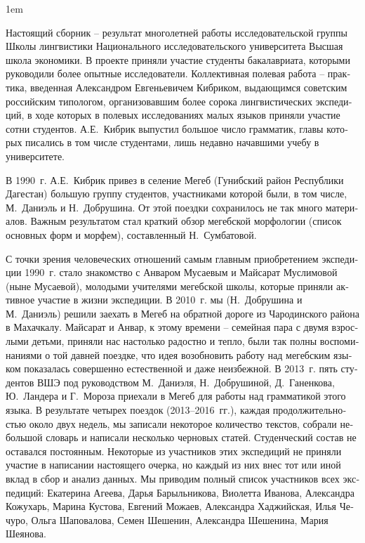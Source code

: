 \begin{russian}


\begin{refsection}

\emergencystretch1em

Настоящий сборник – результат многолетней работы исследовательской
группы Школы лингвистики Национального исследовательского университета
Высшая школа экономики. В проекте приняли участие студенты бакалавриата,
которыми руководили более опытные исследователи. Коллективная полевая
работа – практика, введенная Александром Евгеньевичем Кибриком,
выдающимся советским российским типологом, организовавшим более сорока
лингвистических экспедиций, в ходе которых в полевых исследованиях малых
языков приняли участие сотни студентов. А.Е.~Кибрик выпустил большое
число грамматик, главы которых писались в том числе студентами, лишь
недавно начавшими учебу в университете.


В 1990~г. А.Е.~Кибрик привез в селение Мегеб (Гунибский район Республики
Дагестан) большую группу студентов, участниками которой были, в том
числе, М.~Даниэль и Н.~Добрушина. От этой поездки сохранилось не так
много материалов. Важным результатом стал краткий обзор мегебской
морфологии (список основных форм и морфем), составленный Н.~Сумбатовой.

С точки зрения человеческих отношений самым главным приобретением
экспедиции 1990~г. стало знакомство с Анваром Мусаевым и Майсарат
Муслимовой (ныне Мусаевой), молодыми учителями мегебской школы, которые
приняли активное участие в жизни экспедиции. В 2010~г. мы (Н.~Добрушина
и М.~Даниэль) решили заехать в Мегеб на обратной дороге из Чародинского
района в Махачкалу. Майсарат и Анвар, к этому времени – семейная пара с
двумя взрослыми детьми, приняли нас настолько радостно и тепло, были так
полны воспоминаниями о той давней поездке, что идея возобновить работу
над мегебским языком показалась совершенно естественной и даже
неизбежной. В 2013~г. пять студентов ВШЭ под руководством М.~Даниэля, 
Н.~Добрушиной, Д.~Ганенкова, Ю.~Ландера и Г.~Мороза приехали в Мегеб для
работы над грамматикой этого языка. В результате четырех поездок
(2013–2016~гг.), каждая продолжительностью около двух недель, мы
записали некоторое количество текстов, собрали небольшой словарь и
написали несколько черновых статей. Студенческий состав не оставался
постоянным. Некоторые из участников этих экспедиций не приняли участие в
написании настоящего очерка, но каждый из них внес тот или иной вклад в
сбор и анализ данных. Мы приводим полный список участников всех
экспедиций: Екатерина Агеева, Дарья Барыльникова, Виолетта Иванова,
Александра Кожухарь, Марина Кустова, Евгений Можаев, Александра
Хаджийская, Илья Чечуро, Ольга Шаповалова, Семен Шешенин, Александра
Шешенина, Мария Шеянова.


\end{refsection}
\end{russian}
